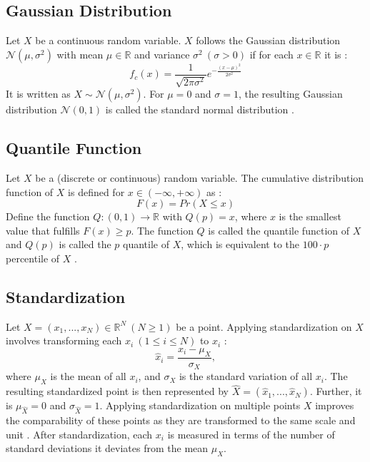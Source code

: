 \subsection*{Gaussian Distribution}
Let $X$ be a continuous random variable. $X$ follows the Gaussian distribution $\mathcal{N}(\mu,\sigma^2)$ with mean $\mu \in \mathbb{R}$ and variance $\sigma^2 \ (\sigma > 0)$ if for each $x \in \mathbb{R}$ it is \cite{Standardization}:
\begin{equation}
f_c(x) = \frac{1}{\sqrt{2\pi\sigma^2}} e^{-\frac{(x-\mu)^2}{2\sigma^2}}
\label{eq:gaussian_distribution}
\end{equation}
It is written as $X \sim \mathcal{N}(\mu,\sigma^2)$. For $\mu = 0$ and $\sigma = 1$, the resulting Gaussian distribution $\mathcal{N}(0,1)$ is called the standard normal distribution \cite{Standardization}.
\subsection*{Quantile Function}
Let $X$ be a (discrete or continuous) random variable. The cumulative distribution function of $X$ is defined for $x \in (-\infty, +\infty)$ as \cite{Standardization}:
\begin{equation}
F(x) = Pr(X \leq x)
\label{eq:cumulative_distribution_function}
\end{equation}
Define the function $Q: (0,1) \rightarrow \mathbb{R}$ with $Q(p) = x$, where $x$ is the smallest value that fulfills $F(x) \geq p$. The function $Q$ is called the quantile function of $X$ and $Q(p)$ is called the $p$ quantile of $X$, which is equivalent to the $100 \cdot p$ percentile of $X$ \cite{Standardization}.
\subsection*{Standardization}
Let $X = (x_1, ..., x_N) \in \mathbb{R}^N \ (N \geq 1)$ be a point. Applying standardization on $X$ involves transforming each $x_i \ (1 \leq i \leq N)$ to $\hat{x}_i$ \cite{Standardization_Concept}:
\begin{equation}
\hat{x}_i = \frac{x_i - \mu_X}{\sigma_X},
\label{eq:standardization}
\end{equation}
where $\mu_X$ is the mean of all $x_i$, and $\sigma_X$ is the standard variation of all $x_i$. The resulting standardized point is then represented by $\hat{X} = (\hat{x}_1, ..., \hat{x}_N)$. Further, it is $\mu_{\hat{X}} = 0$ and $\sigma_{\hat{X}} = 1$. \newline
Applying standardization on multiple points $X$ improves the comparability of these points as they are transformed to the same scale and unit \cite{Standardization_Concept}. After standardization, each $x_i$ is measured in terms of the number of standard deviations it deviates from the mean $\mu_X$.

